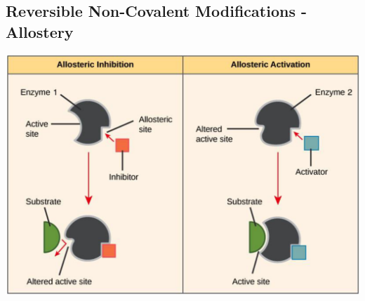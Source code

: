 \documentclass[10pt]{article}
\begin{document}
\subsection*{Reversible Non-Covalent Modifications - Allostery}
\begin{center} 
	\includegraphics*[width=\textwidth]{L1_17.png}
\end{center}
\end{document}
